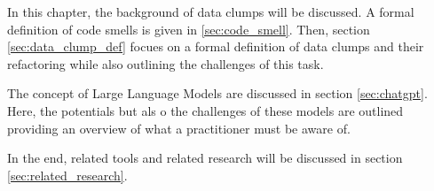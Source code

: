 

In this chapter, the background of data clumps will be discussed. A formal definition of code smells is given in \ref{sec:code_smell}. Then, section \ref{sec:data_clump_def} focues on a formal definition of data clumps and their refactoring while also outlining the challenges of this task.

The concept of Large Language Models are discussed in section \ref{sec:chatgpt}. Here, the potentials but als o the challenges of these models are outlined providing an overview of what a practitioner must be aware of.

In the end, related tools and related research will be discussed in section \ref{sec:related_research}. 








